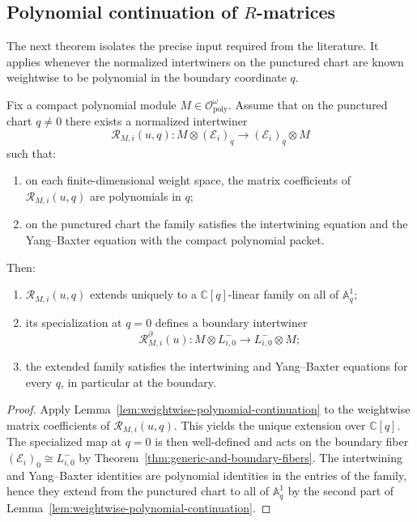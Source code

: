 \subsection{Polynomial continuation of $R$-matrices}

The next theorem isolates the precise input required from the literature.
It applies whenever the normalized intertwiners on the punctured chart are
known weightwise to be polynomial in the boundary coordinate $q$.

\begin{theorem}
\ClaimStatusProvedHere
\label{thm:continuation-of-polynomial-R-matrices}
Fix a compact polynomial module $M\in \mathcal O^{\omega}_{\mathrm{poly}}$.
Assume that on the punctured chart $q\neq 0$ there exists a normalized
intertwiner
\begin{equation}
\mathscr R_{M,i}(u,q):
M\otimes (\mathcal E_i)_q
\longrightarrow
(\mathcal E_i)_q\otimes M
\end{equation}
such that:
\begin{enumerate}
 \item on each finite-dimensional weight space, the matrix
 coefficients of $\mathscr R_{M,i}(u,q)$ are polynomials in $q$;
 \item on the punctured chart the family satisfies the intertwining
 equation and the Yang--Baxter equation with the compact polynomial
 packet.
\end{enumerate}
Then:
\begin{enumerate}
 \item $\mathscr R_{M,i}(u,q)$ extends uniquely to a
 $\mathbb C[q]$-linear family on all of $\mathbb A^1_q$;
 \item its specialization at $q=0$ defines a boundary intertwiner
 \begin{equation}
 \mathscr R_{M,i}^{\partial}(u):
 M\otimes L^-_{i,0}
 \longrightarrow
 L^-_{i,0}\otimes M;
 \end{equation}
 \item the extended family satisfies the intertwining and
 Yang--Baxter equations for every $q$, in particular at the boundary.
\end{enumerate}
\end{theorem}

\begin{proof}
Apply Lemma~\ref{lem:weightwise-polynomial-continuation} to the weightwise
matrix coefficients of $\mathscr R_{M,i}(u,q)$. This yields the unique
extension over $\mathbb C[q]$. The specialized map at $q=0$ is then
well-defined and acts on the boundary fiber
$(\mathcal E_i)_0\cong L^-_{i,0}$ by
Theorem~\ref{thm:generic-and-boundary-fibers}. The intertwining and
Yang--Baxter identities are polynomial identities in the entries of the
family, hence they extend from the punctured chart to all of
$\mathbb A^1_q$ by the second part of
Lemma~\ref{lem:weightwise-polynomial-continuation}.
\end{proof}

